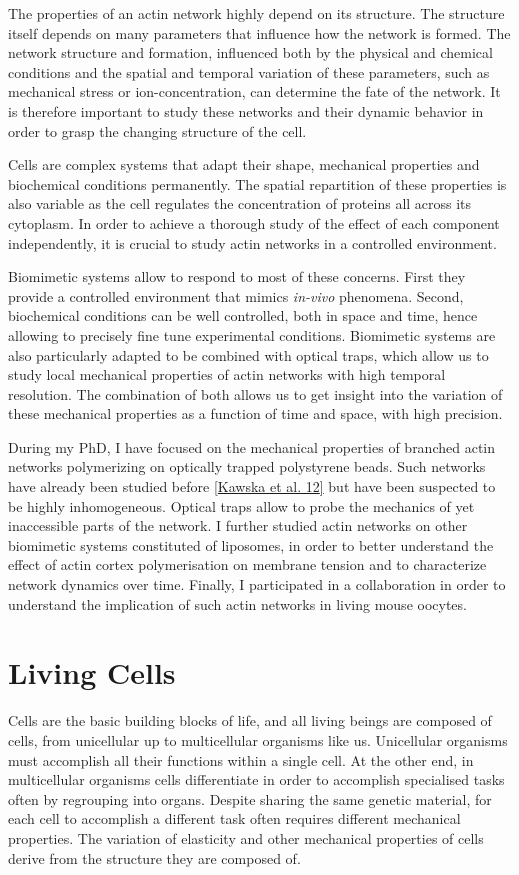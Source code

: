 \documentclass[A4paperpaper,11pt,english]{sphinxmanual}
\begin{document}
The properties of an actin network highly depend on its structure. The
structure itself depends on many parameters that influence how the network is
formed.  The network structure and formation, influenced both by the physical and
chemical conditions and the spatial and temporal variation of these parameters, such as mechanical
stress or ion-concentration, can determine the fate of the network. It is
therefore important to study these networks and their dynamic behavior in order to grasp the
changing structure of the cell.

Cells are complex systems that adapt their shape, mechanical properties and
biochemical conditions permanently. The spatial repartition of these
properties is also variable as the cell regulates the concentration of proteins
all across its cytoplasm. In order to achieve a thorough study of the effect of each component independently,
it is crucial to study actin networks in a controlled environment.

Biomimetic systems allow to respond to most of these concerns. First they provide a
controlled environment that mimics \emph{in-vivo} phenomena. Second, biochemical conditions
can be well controlled, both in space and time, hence allowing to precisely fine tune
experimental conditions. Biomimetic systems are also particularly adapted to be combined with
optical traps, which allow us to study local mechanical properties of actin
networks with high temporal resolution. The combination of both allows us to get
insight into the variation of these mechanical properties as a function of
time and space, with high precision.

During my PhD, I have focused on the mechanical properties of branched actin
networks polymerizing on optically trapped polystyrene beads. Such networks have already been
studied before {\hyperref[parts/part1:kawska2012]{{[}Kawska et al. 12{]}}} but have been suspected to be highly
inhomogeneous. Optical traps allow to probe the mechanics of yet inaccessible parts of
the network.
I further studied actin
networks on other biomimetic systems constituted of liposomes, in order to better
understand the effect of actin cortex polymerisation on membrane tension and to
characterize network dynamics over time. Finally,  I participated in a
collaboration in order to understand the implication of such actin networks in
living mouse oocytes.


\section{Living Cells}
\label{parts/part1:living-cells}
Cells are the basic building blocks of life, and all living beings are composed of
cells, from unicellular up to multicellular organisms like us. Unicellular
organisms must accomplish all their functions within a single cell. At the other end,
in multicellular organisms cells differentiate in order to accomplish specialised
tasks often by regrouping into organs. Despite sharing the same genetic
material, for each cell to accomplish a different task often requires different
mechanical properties. The variation of elasticity and other
mechanical properties of cells derive from the structure they are composed of.
\end{document}
